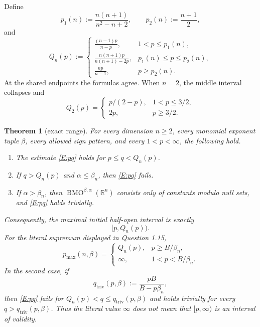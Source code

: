 \documentclass[11pt]{article}
\newtheorem{theorem}{Theorem}
\newcommand{\R}{\mathbb R}
\newcommand{\BMO}{\operatorname{BMO}}
\begin{document}
Define
\[
 p_1(n):=\frac{n(n+1)}{n^2-n+2},\qquad
 p_2(n):=\frac{n+1}{2},
\]
and
\begin{equation}\label{E:Q}
 Q_n(p):=
 \begin{cases}
 \displaystyle\frac{(n-1)p}{n-p},&1<p\le p_1(n),\\[6pt]
 \displaystyle\frac{n(n+1)p}{n(n+1)-2p},&p_1(n)\le p\le p_2(n),\\[6pt]
 \displaystyle\frac{np}{n-1},&p\ge p_2(n).
 \end{cases}
\end{equation}
At the shared endpoints the formulas agree.  When $n=2$, the middle interval
collapses and
\[
 Q_2(p)=\begin{cases}p/(2-p),&1<p\le3/2,\\2p,&p\ge3/2.\end{cases}
\]

\begin{theorem}[exact range]\label{T:main}
For every dimension $n\ge2$, every monomial exponent tuple $\beta$, every
allowed sign pattern, and every $1<p<\infty$, the following hold.
\begin{enumerate}
 \item The estimate \eqref{E:pq} holds for $p\le q<Q_n(p)$.
 \item If $q>Q_n(p)$ and $\alpha\le\beta_n$, then \eqref{E:pq} fails.
 \item If $\alpha>\beta_n$, then $\BMO^{\beta,\alpha}(\R^n)$ consists only
 of constants modulo null sets, and \eqref{E:pq} holds trivially.
\end{enumerate}
Consequently, the maximal initial half-open interval is exactly
\[
                         [p,Q_n(p)).
\]
For the literal supremum displayed in Question 1.15,
\begin{equation}\label{E:pmax}
 p_{\max}(n,\beta)=
 \begin{cases}
 Q_n(p),&p\ge B/\beta_n,\\
 \infty,&1<p<B/\beta_n.
 \end{cases}
\end{equation}
In the second case, if
\begin{equation}\label{E:qtriv}
 q_{\mathrm{triv}}(p,\beta):=\frac{pB}{B-p\beta_n},
\end{equation}
then \eqref{E:pq} fails for
$Q_n(p)<q\le q_{\mathrm{triv}}(p,\beta)$ and holds trivially for every
$q>q_{\mathrm{triv}}(p,\beta)$.  Thus the literal value $\infty$ does
\emph{not} mean that $[p,\infty)$ is an interval of validity.
\end{theorem}
\end{document}
